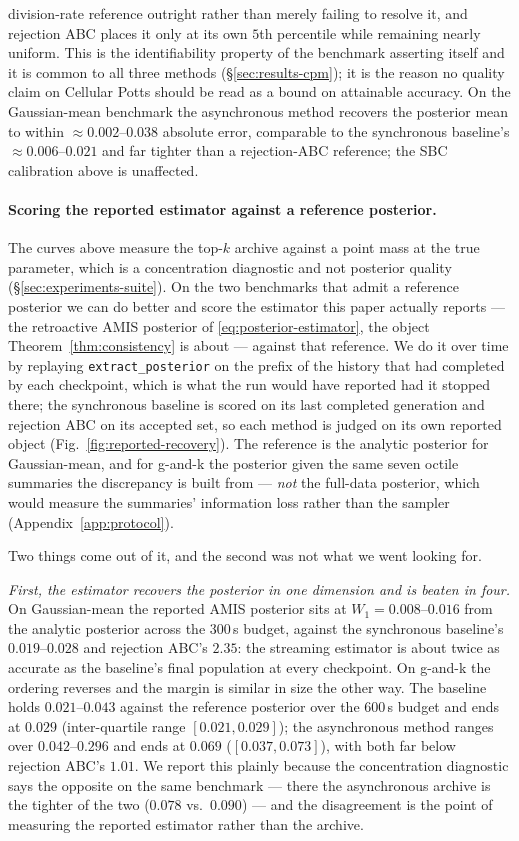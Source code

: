division-rate reference outright rather than merely failing to resolve it, and rejection ABC places it only at its own $5$th percentile while remaining nearly uniform. This is the identifiability property of the benchmark asserting itself and it is common to all three methods (\S\ref{sec:results-cpm}); it is the reason no quality claim on Cellular Potts should be read as a bound on attainable accuracy. On the Gaussian-mean benchmark the asynchronous method recovers the posterior mean to within $\approx0.002$--$0.038$ absolute error, comparable to the synchronous baseline's $\approx0.006$--$0.021$ and far tighter than a rejection-ABC reference; the SBC calibration above is unaffected.

\paragraph{Scoring the reported estimator against a reference posterior.} The curves above measure the top-$k$ archive against a point mass at the true parameter, which is a concentration diagnostic and not posterior quality (\S\ref{sec:experiments-suite}). On the two benchmarks that admit a reference posterior we can do better and score the estimator this paper actually reports --- the retroactive AMIS posterior of \eqref{eq:posterior-estimator}, the object Theorem~\ref{thm:consistency} is about --- against that reference. We do it over time by replaying \texttt{extract\_posterior} on the prefix of the history that had completed by each checkpoint, which is what the run would have reported had it stopped there; the synchronous baseline is scored on its last completed generation and rejection ABC on its accepted set, so each method is judged on its own reported object (Fig.~\ref{fig:reported-recovery}). The reference is the analytic posterior for Gaussian-mean, and for g-and-k the posterior given the same seven octile summaries the discrepancy is built from --- \emph{not} the full-data posterior, which would measure the summaries' information loss rather than the sampler (Appendix~\ref{app:protocol}).

Two things come out of it, and the second was not what we went looking for.

\emph{First, the estimator recovers the posterior in one dimension and is beaten in four.} On Gaussian-mean the reported AMIS posterior sits at $W_1 = 0.008$--$0.016$ from the analytic posterior across the $300$\,s budget, against the synchronous baseline's $0.019$--$0.028$ and rejection ABC's $2.35$: the streaming estimator is about twice as accurate as the baseline's final population at every checkpoint. On g-and-k the ordering reverses and the margin is similar in size the other way. The baseline holds $0.021$--$0.043$ against the reference posterior over the $600$\,s budget and ends at $0.029$ (inter-quartile range $[0.021,0.029]$); the asynchronous method ranges over $0.042$--$0.296$ and ends at $0.069$ ($[0.037,0.073]$), with both far below rejection ABC's $1.01$. We report this plainly because the concentration diagnostic says the opposite on the same benchmark --- there the asynchronous archive is the tighter of the two ($0.078$ vs.\ $0.090$) --- and the disagreement is the point of measuring the reported estimator rather than the archive.

